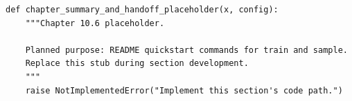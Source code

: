 \begin{lstlisting}[style=bookpython,caption={Planned code placeholder for chapter summary and handoff.},label={lst:ch10-chapter-summary-and-handoff}]
def chapter_summary_and_handoff_placeholder(x, config):
    """Chapter 10.6 placeholder.

    Planned purpose: README quickstart commands for train and sample.
    Replace this stub during section development.
    """
    raise NotImplementedError("Implement this section's code path.")
\end{lstlisting}
